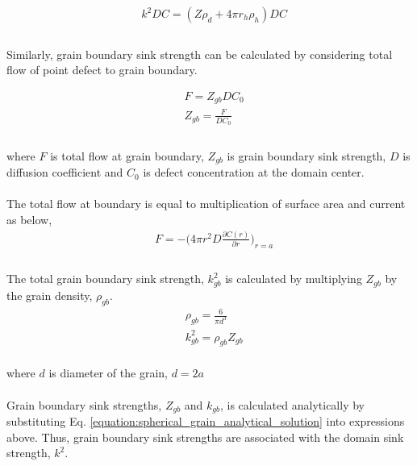 \documentclass[utf8]{frontiersSCNS} %
\begin{document}
    \begin{equation}
      \begin{aligned}
        &k^2DC=(Z\rho_d+4\pi r_h\rho_h)DC\\
      \end{aligned}
    \end{equation}\\
    Similarly, grain boundary sink strength can be calculated by considering total flow of point defect to grain boundary.

    \begin{equation}
      \begin{aligned}
        &F=Z_{gb}DC_0\\
        &Z_{gb}=\frac{F}{DC_0}\\
      \end{aligned}
      \end{equation}\\

    where ${F}$ is total flow at grain boundary, ${Z_{gb}}$ is grain boundary sink strength, ${D}$ is diffusion coefficient and ${C_0}$ is defect concentration at the domain center.\\\\
    The total flow at boundary is equal to multiplication of surface area and current as below,\\

    \begin{equation}
      \begin{aligned}
        &F=-\bigg(4\pi r^2D\frac{\partial C(r)}{\partial r}\bigg)_{r=a}\\
      \end{aligned}
    \end{equation}\\
    The total grain boundary sink strength, ${k^2_{gb}}$ is calculated by multiplying ${Z_{gb}}$ by the grain density, ${\rho_{gb}}$. \citep{heald1977}
    \begin{equation}
      \begin{aligned}
        &\rho_{gb}=\frac{6}{\pi d^3}\\
        &k^2_{gb}=\rho_{gb}Z_{gb}\\
      \end{aligned}
    \end{equation}

    where ${d}$ is diameter of the grain, ${d=2a}$\\\\
    Grain boundary sink strengths, ${Z_{gb}}$ and ${k_{gb}}$, is calculated analytically by substituting Eq.  \ref{equation:spherical_grain_analytical_solution} into expressions above. Thus, grain boundary sink strengths are associated with the domain sink strength, ${k^2}$. \citep{heald1977}
\end{document}
